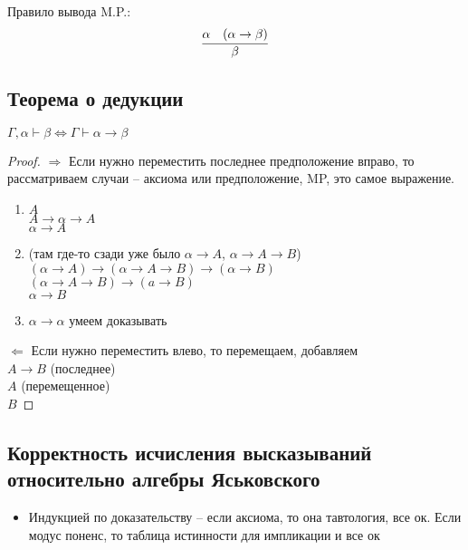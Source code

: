 Правило вывода M.P.:
\[\infer{\beta}{\alpha & (\alpha \rightarrow \beta)}\]
\subsection{Теорема о дедукции}
\label{sec-3-4}
\begin{theorem}
	$\Gamma, \alpha \vdash \beta \Leftrightarrow \Gamma \vdash \alpha \to \beta$
\end{theorem}
\begin{proof}

$\Rightarrow$ 
Если нужно переместить последнее предположение вправо,
то рассматриваем случаи -- аксиома или предположение,
MP, это самое выражение.
\begin{enumerate}
\item $A$ \\
$A\to \alpha \to A$ \\
$\alpha \to A$
\item (там где-то сзади уже было $\alpha \to A$, $\alpha \to A \to B$) \\
$(\alpha \to A)\to (\alpha \to A \to B)\to (\alpha \to B)$ \\
$(\alpha \to A\to B)\to (a\to B)$ \\
$\alpha \to B$
\item $\alpha\to \alpha$ умеем доказывать
\end{enumerate}
$\Leftarrow$ Если нужно переместить влево, то перемещаем, добавляем \\
$A\to B$ (последнее) \\
$A$    (перемещенное) \\
$B$
\end{proof}

\subsection{Корректность исчисления высказываний относительно алгебры Яськовского}
\label{sec-3-5}
\begin{itemize}
\item Индукцией по доказательству -- если аксиома, то она
тавтология, все ок. Если модус поненс, то таблица
истинности для импликации и все ок
\end{itemize}
